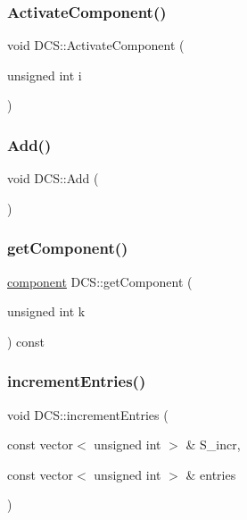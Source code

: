 \subsubsection{\texorpdfstring{Activate\+Component()}{ActivateComponent()}}
{\footnotesize\ttfamily void D\+C\+S\+::\+Activate\+Component (\begin{DoxyParamCaption}\item[{unsigned int}]{i }\end{DoxyParamCaption})}

\mbox{\label{class_d_c_s_a8d3778638a4104c2c41569aca7ed17b1}} 
\subsubsection{\texorpdfstring{Add()}{Add()}}
{\footnotesize\ttfamily void D\+C\+S\+::\+Add (\begin{DoxyParamCaption}{ }\end{DoxyParamCaption})}

\mbox{\label{class_d_c_s_af1f82450ff5c80deff0fb2d270bf6276}} 
\subsubsection{\texorpdfstring{get\+Component()}{getComponent()}}
{\footnotesize\ttfamily \hyperlink{_d_c_s_8h_aff5561f7728e7d2c203fbfeac4a73866}{component} D\+C\+S\+::get\+Component (\begin{DoxyParamCaption}\item[{unsigned int}]{k }\end{DoxyParamCaption}) const}

\mbox{\label{class_d_c_s_a7e537421b8edf48c1d00c859c9be53da}} 
\subsubsection{\texorpdfstring{increment\+Entries()}{incrementEntries()}}
{\footnotesize\ttfamily void D\+C\+S\+::increment\+Entries (\begin{DoxyParamCaption}\item[{const vector$<$ unsigned int $>$ \&}]{S\+\_\+incr,  }\item[{const vector$<$ unsigned int $>$ \&}]{entries }\end{DoxyParamCaption})}

